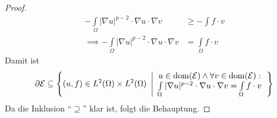 \begin{beispiel}
\begin{proof}
\begin{align*}
			-\int\limits_\Omega|\nabla u|^{p-2}\cdot\nabla u\cdot\nabla v&\geq-\int\limits f\cdot v\\
			\implies
			-\int\limits_\Omega |\nabla u|^{p-2}\cdot\nabla u\cdot\nabla v&=\int\limits_\Omega f\cdot v
		\end{align*}
		Damit ist 
		\begin{align*}
			\partial\mathcal{E}\subseteq\left\lbrace(u,f)\in L^2(\Omega)\times L^2(\Omega)~\left|
			\begin{array}{c}
				u\in\operatorname{dom}(\mathcal{E})\wedge\forall v\in\operatorname{dom}(\mathcal{E}):\\
				\int\limits_\Omega|\nabla u|^{p-2}\cdot\nabla u\cdot\nabla v=\int\limits_\Omega f\cdot v
			\end{array}
			\right.\right\rbrace
		\end{align*}
		Da die Inklusion ``$\supseteq$'' klar ist, folgt die Behauptung.


\end{proof}
\end{beispiel}
